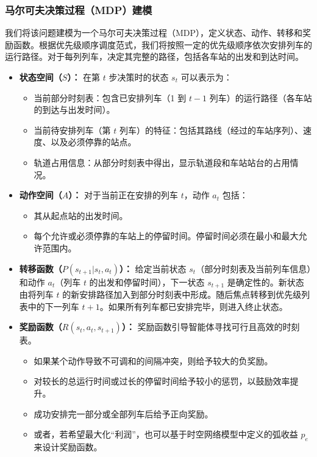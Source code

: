 \documentclass{article}
\begin{document}
    \subsubsection{马尔可夫决策过程（MDP）建模}
    我们将该问题建模为一个马尔可夫决策过程（MDP），定义状态、动作、转移和奖励函数。根据优先级顺序调度范式，我们将按照一定的优先级顺序依次安排列车的运行路径。对于每列列车，决定其完整的路径，包括各车站的出发和到达时间。
    \begin{itemize}
        \item \textbf{状态空间（$S$）：}
        在第 $t$ 步决策时的状态 $s_t$ 可以表示为：
        \begin{itemize}
            \item 当前部分时刻表：包含已安排列车（1 到 $t-1$ 列车）的运行路径（各车站的到达与出发时间）。
            \item 当前待安排列车（第 $t$ 列车）的特征：包括其路线（经过的车站序列）、速度、以及必须停靠的站点。
            \item 轨道占用信息：从部分时刻表中得出，显示轨道段和车站站台的占用情况。
        \end{itemize}

        \item \textbf{动作空间（$A$）：}
        对于当前正在安排的列车 $t$，动作 $a_t$ 包括：
        \begin{itemize}
            \item 其从起点站的出发时间。
            \item 每个允许或必须停靠的车站上的停留时间。停留时间必须在最小和最大允许范围内。
        \end{itemize}

        \item \textbf{转移函数（$P(s_{t+1} | s_t, a_t)$）：}
        给定当前状态 $s_t$（部分时刻表及当前列车信息）和动作 $a_t$（列车 $t$ 的出发和停留时间），下一状态 $s_{t+1}$ 是确定性的。新状态由将列车 $t$ 的新安排路径加入到部分时刻表中形成。随后焦点转移到优先级列表中的下一列车 $t+1$。如果所有列车都已安排完毕，则进入终止状态。

        \item \textbf{奖励函数（$R(s_t, a_t, s_{t+1})$）：}
        奖励函数引导智能体寻找可行且高效的时刻表。
        \begin{itemize}
            \item 如果某个动作导致不可调和的间隔冲突，则给予较大的负奖励。
            \item 对较长的总运行时间或过长的停留时间给予较小的惩罚，以鼓励效率提升。
            \item 成功安排完一部分或全部列车后给予正向奖励。
            \item 或者，若希望最大化“利润”，也可以基于时空网络模型中定义的弧收益 $p_e$ 来设计奖励函数。
        \end{itemize}
    \end{itemize}
\end{document}
